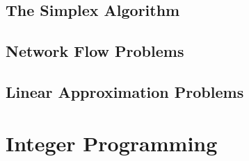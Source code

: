 \subsection{The Simplex Algorithm}\label{sec:simplex}


\subsection{Network Flow Problems}\label{sec:xportation}


\subsection{Linear Approximation Problems}\label{sec:approx}


\section{Integer Programming}\label{sec:ip}

